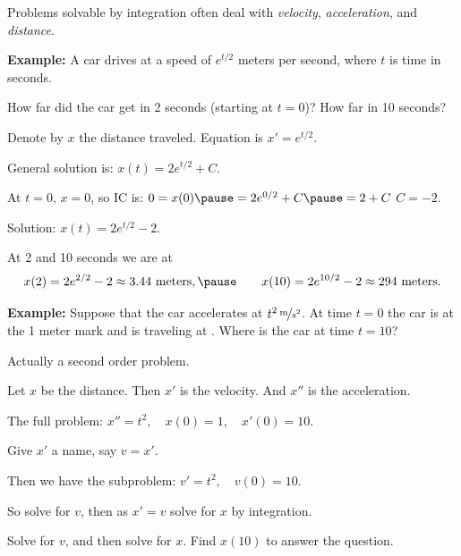 \documentclass[10pt,aspectratio=169]{beamer}
\begin{document}
\begin{frame}
Problems solvable by integration often deal
with \emph{velocity}, \emph{acceleration}, and \emph{distance}.

\medskip
\pause

\textbf{Example:}
A car drives at a speed of $e^{t/2}$ meters per second, where $t$ is time in seconds.

How far did the car get in 2 seconds (starting at $t=0$)?  How far in 10 seconds?

\medskip
\pause

Denote by $x$ the distance traveled.
\pause
Equation is \quad $x' = e^{t/2}$.

\medskip
\pause

General solution is: \quad
$x(t) = 2 e^{t/2} + C$.

\medskip
\pause

At $t=0$, $x=0$, so IC is:
\quad
$0 = x(0) \pause = 2e^{0/2} + C \pause = 2 + C$
\pause
\wthus
$C=-2$.

\medskip
\pause

Solution: 
\quad
$x(t) = 2 e^{t/2} - 2$.

\medskip
\pause

At 2 and 10 seconds we are at
\begin{equation*}
x(2) = 2e^{2/2} - 2 \approx 3.44 \text{ meters} ,
\pause
\qquad
x(10) = 2e^{10/2} - 2 \approx 294 \text{ meters} .
\end{equation*}
\end{frame}

\begin{frame}
\textbf{Example:}
Suppose that the car accelerates at $\unitfrac[t^2]{m}{s^2}$.
\pause
At time $t=0$ the car is at the 1 meter mark and is traveling at
.
\pause
Where is the car at time $t=10$?

\medskip
\pause

Actually a second order problem.

\medskip
\pause

Let $x$ be the distance.
\quad
Then $x'$ is the velocity.
\quad
And $x''$ is the acceleration.

\medskip
\pause

The full problem: \quad $x'' = t^2 , \quad x(0) = 1 , \quad x'(0) = 10$.

\medskip
\pause

Give $x'$ a name, say $v=x'$.

\medskip
\pause

Then we have the subproblem: \quad 
$v' = t^2, \quad v(0) = 10$.

\medskip
\pause

So solve for $v$, then as $x'=v$ solve for $x$ by integration.

\pause

\begin{exercise}
Solve for $v$, and then solve for $x$.  Find $x(10)$ to answer the
question.
\end{exercise}

\end{frame}
\end{document}
